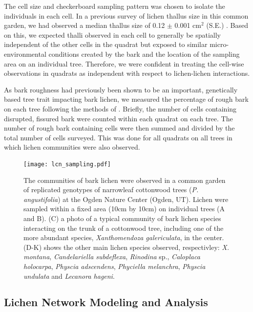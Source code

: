 \documentclass[9pt,twocolumn,twoside,lineno]{pnas-new}
\begin{document}
{The cell size and checkerboard sampling pattern was chosen to isolate
the individuals in each cell. In a previous survey of lichen thallus
size in this common garden, we had observed a median thallus size of
0.12 $\pm$ 0.001 cm$^2$ (S.E.) \cite{Lamit2015}. Based on this, we
expected thalli observed in each cell to generally be spatially
independent of the other cells in the quadrat but exposed to similar
micro-environmental conditions created by the bark and the location of
the sampling area on an individual tree. Therefore, we were confident
in treating the cell-wise observations in quadrats as independent with
respect to lichen-lichen interactions.

As bark roughness had previously been shown to be an important,
genetically based tree trait impacting bark lichen, we measured the
percentage of rough bark on each tree following the methods of
\citep{Lamit2012}. Briefly, the number of cells containing disrupted,
fissured bark were counted within each quadrat on each tree. The
number of rough bark containing cells were then summed and divided by
the total number of cells surveyed. This was done for all quadrats on
all trees in which lichen communities were also observed.


\begin{figure}[ht]
\centering
\texttt{[image: lcn\_sampling.pdf]}
\caption{The communities of bark lichen were observed in a common
  garden of replicated genotypes of narrowleaf cottonwood trees
  (\textit{P. angustifolia}) at the Ogden Nature Center (Ogden,
  UT). Lichen were sampled within a fixed area (10cm by 10cm) on
  individual trees (A and B). (C) a photo of a typical community of
  bark lichen species interacting on the trunk of a cottonwood tree,
  including one of the more abundant species, \textit{Xanthomendoza
    galericulata}, in the center. (D-K) shows the other main lichen
  species observed, respectivley:  \textit{X. montana},
  \textit{Candelariella subdeflexa}, \textit{Rinodina} sp.,
  \textit{Caloplaca holocarpa}, \textit{Physcia adscendens},
  \textit{Phyciella melanchra}, \textit{Physcia undulata} and
  \textit{Lecanora hageni}.}
\label{fig:lichen_sampling}
\end{figure}



\subsection*{Lichen Network Modeling and Analysis}

}
\end{document}

